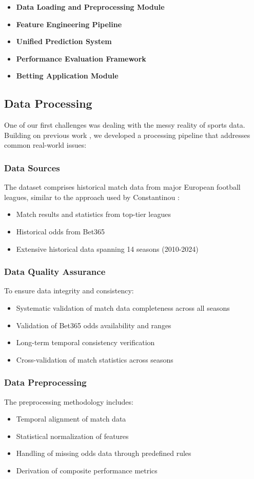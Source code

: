 \documentclass[conference]{IEEEtran}
\begin{document}
\begin{itemize}
\item \textbf{Data Loading and Preprocessing Module}
\item \textbf{Feature Engineering Pipeline}
\item \textbf{Unified Prediction System}
\item \textbf{Performance Evaluation Framework}
\item \textbf{Betting Application Module}
\end{itemize}

\subsection{Data Processing}
One of our first challenges was dealing with the messy reality of sports data. Building on previous work \cite{hubacek2019exploiting}, we developed a processing pipeline that addresses common real-world issues:

\subsubsection{Data Sources}
The dataset comprises historical match data from major European football leagues, similar to the approach used by Constantinou \cite{constantinou2019dolores}:
\begin{itemize}
\item Match results and statistics from top-tier leagues
\item Historical odds from Bet365
\item Extensive historical data spanning 14 seasons (2010-2024)
\end{itemize}

\subsubsection{Data Quality Assurance}
To ensure data integrity and consistency:
\begin{itemize}
\item Systematic validation of match data completeness across all seasons
\item Validation of Bet365 odds availability and ranges
\item Long-term temporal consistency verification
\item Cross-validation of match statistics across seasons
\end{itemize}

\subsubsection{Data Preprocessing}
The preprocessing methodology includes:
\begin{itemize}
\item Temporal alignment of match data
\item Statistical normalization of features
\item Handling of missing odds data through predefined rules
\item Derivation of composite performance metrics
\end{itemize}
\end{document}
